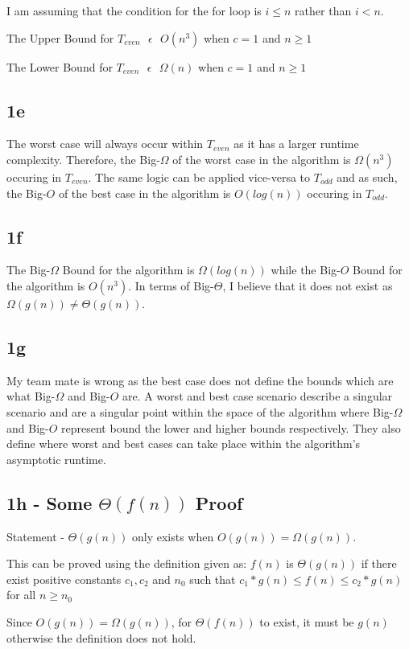 \documentclass[oneside, a4paper]{article}
\begin{document}
I am assuming that the condition for the for loop is $i \leq n$ rather than $i < n$.  

The Upper Bound for $T_{even} \text{ } \epsilon \text{ } O(n^3)$ when $c = 1$ and $n \geq 1$

The Lower Bound for $T_{even} \text{ } \epsilon \text{ } \Omega(n)$ when $c = 1$ and $n \geq 1$ 

\subsection*{1e}
The worst case will always occur within $T_{even}$ as it has a larger runtime complexity. Therefore, the Big-$\Omega$ of the worst case in the algorithm is $\Omega(n^3)$ occuring in $T_{even}$. The same logic can be applied vice-versa to $T_{odd}$ and as such, the Big-$O$ of the best case in the algorithm is $O(log(n))$ occuring in $T_{odd}$.

\subsection*{1f}
The Big-$\Omega$ Bound for the algorithm is $\Omega(log(n))$ while the Big-$O$ Bound for the algorithm is $O(n^3)$. In terms of Big-$\Theta$, I believe that it does not exist as $\Omega(g(n)) \neq \Theta(g(n))$.


\subsection*{1g}
My team mate is wrong as the best case does not define the bounds which are what Big-$\Omega$ and Big-$O$ are. A worst and best case scenario describe a singular scenario and are a singular point within the space of the algorithm where Big-$\Omega$ and Big-$O$ represent bound the lower and higher bounds respectively. They also define where worst and best cases can take place within the algorithm's asymptotic runtime.
\subsection*{1h - Some $\Theta(f(n))$ Proof}
Statement - $\Theta(g(n))$ only exists when $O(g(n)) = \Omega(g(n))$. 

This can be proved using the definition given as:
$f(n)$ is $\Theta(g(n))$ if there exist positive constants $c_1, c_2$ and $n_0$ such that $c_1 * g(n) \leq f(n) \leq c_2 * g(n)$ for all $n \geq n_0$

Since $O(g(n)) = \Omega(g(n))$, for $\Theta(f(n))$ to exist, it must be $g(n)$ otherwise the definition does not hold. 
\end{document}
